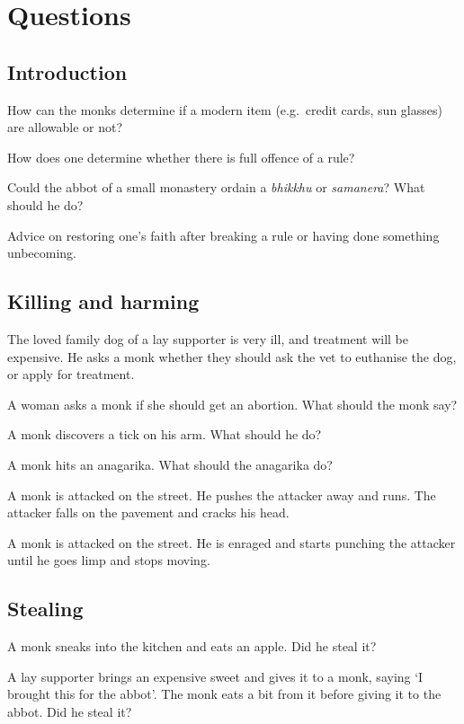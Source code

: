 \chapter{Questions}

\section{Introduction}

How can the monks determine if a modern item (e.g.~credit cards, sun
glasses) are allowable or not?

How does one determine whether there is full offence of a rule?

Could the abbot of a small monastery ordain a \emph{bhikkhu} or
\emph{samanera}? What should he do?

Advice on restoring one's faith after breaking a rule or having done
something unbecoming.

\section{Killing and harming}

The loved family dog of a lay supporter is very ill, and treatment will
be expensive. He asks a monk whether they should ask the vet to
euthanise the dog, or apply for treatment.

A woman asks a monk if she should get an abortion. What should the monk
say?

A monk discovers a tick on his arm. What should he do?

A monk hits an anagarika. What should the anagarika do?

A monk is attacked on the street. He pushes the attacker away and runs.
The attacker falls on the pavement and cracks his head.

A monk is attacked on the street. He is enraged and starts punching the
attacker until he goes limp and stops moving.

\section{Stealing}

A monk sneaks into the kitchen and eats an apple. Did he steal it?

A lay supporter brings an expensive sweet and gives it to a monk, saying
`I brought this for the abbot'. The monk eats a bit from it before
giving it to the abbot. Did he steal it?

